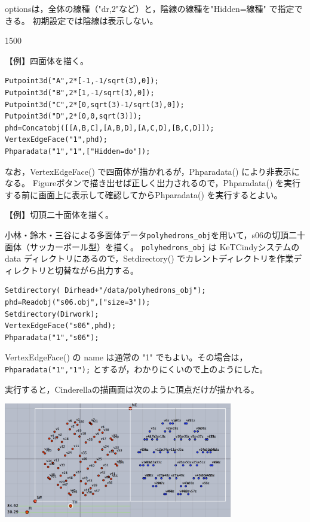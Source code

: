\documentclass[papersize,a4paper,12pt,uplatex]{jsarticle}
\begin{document}
\begin{description}
optionsは，全体の線種（"dr,2"など）と，陰線の線種を"Hidden=線種" で指定できる。 初期設定では陰線は表示しない。

\vspace{\baselineskip}
\begin{layer}{150}{0}
\end{layer}

【例】四面体を描く。
\begin{verbatim}
Putpoint3d("A",2*[-1,-1/sqrt(3),0]);
Putpoint3d("B",2*[1,-1/sqrt(3),0]);
Putpoint3d("C",2*[0,sqrt(3)-1/sqrt(3),0]);
Putpoint3d("D",2*[0,0,sqrt(3)]);
phd=Concatobj([[A,B,C],[A,B,D],[A,C,D],[B,C,D]]);
VertexEdgeFace("1",phd);
Phparadata("1","1",["Hidden=do"]);
\end{verbatim}

なお，VertexEdgeFace() で四面体が描かれるが，Phparadata() により非表示になる。
Figureボタンで描き出せば正しく出力されるので，Phparadata() を実行する前に画面上に表示して確認してからPhparadata() を実行するとよい。

\vspace{\baselineskip}
【例】切頂二十面体を描く。

小林・鈴木・三谷による多面体データ\verb|polyhedrons_obj|を用いて，s06の切頂二十面体（サッカーボール型）を描く。 \verb|polyhedrons_obj| は KeTCindyシステムの data ディレクトリにあるので，Setdirectory() でカレントディレクトリを作業ディレクトリと切替ながら出力する。
\begin{verbatim}
Setdirectory( Dirhead+"/data/polyhedrons_obj");
phd=Readobj("s06.obj",["size=3"]);
Setdirectory(Dirwork);
VertexEdgeFace("s06",phd);
Phparadata("1","s06");
\end{verbatim}
VertexEdgeFace() の name は通常の "1" でもよい。その場合は，\verb|Phparadata("1","1");| とするが，わかりにくいので上のようにした。

実行すると，Cinderellaの描画面は次のように頂点だけが描かれる。

\vspace{\baselineskip}
\begin{center}
 \includegraphics[bb=0 0 726.04 365.02 , width=10cm]{Fig/phparadata01.pdf}
\end{center}
 

\end{description}
\end{document}
